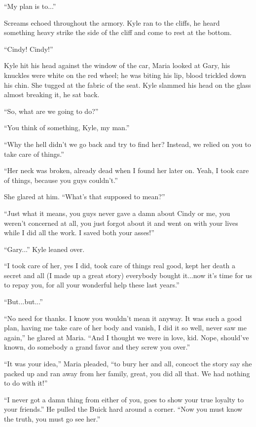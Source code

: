 ``My plan is to...''

Screams echoed throughout the armory. Kyle ran to the cliffs, he heard
something heavy strike the side of the cliff and come to rest at the
bottom.

``Cindy! Cindy!''

Kyle hit his head against the window of the car, Maria looked at Gary,
his knuckles were white on the red wheel; he was biting his lip, blood
trickled down his chin. She tugged at the fabric of the seat. Kyle
slammed his head on the glass almost breaking it, he sat back.

``So, what are we going to do?''

``You think of something, Kyle, my man.''

``Why the hell didn't we go back and try to find her? Instead, we relied
on you to take care of things.''

``Her neck was broken, already dead when I found her later on. Yeah, I
took care of things, because you guys couldn't.''

She glared at him. ``What's that supposed to mean?''

``Just what it means, you guys never gave a damn about Cindy or me, you
weren't concerned at all, you just forgot about it and went on with your
lives while I did all the work. I saved both your asses!''

``Gary...'' Kyle leaned over.

``I took care of her, yes I did, took care of things real good, kept her
death a secret and all (I made up a great story) everybody bought
it...now it's time for us to repay you, for all your wonderful help
these last years.''

``But...but...''

``No need for thanks. I know you wouldn't mean it anyway. It was such a
good plan, having me take care of her body and vanish, I did it so well,
never saw me again,'' he glared at Maria. ``And I thought we were in
love, kid. Nope, should've known, do somebody a grand favor and they
screw you over.''

``It was your idea,'' Maria pleaded, ``to bury her and all, concoct the
story say she packed up and ran away from her family, great, you did all
that. We had nothing to do with it!''

``I never got a damn thing from either of you, goes to show your true
loyalty to your friends.'' He pulled the Buick hard around a corner.
``Now you must know the truth, you must go see her.''

